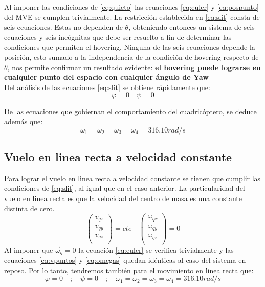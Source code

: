 \documentclass[main]{subfiles}
\begin{document}
Al imponer las condiciones de \ref{eq:quieto} las ecuaciones \ref{eq:euler} y \ref{eq:pospunto} del MVE se cumplen trivialmente. La restricci\'on establecida en \ref{eq:slit} consta de seis ecuaciones. Estas no dependen de $\theta$, obteniendo entonces un sistema de seis ecuaciones y seis inc\'ognitas que debe ser resuelto a fin de determinar las condiciones que permiten el hovering. Ninguna de las seis ecuaciones depende la posici\'on, esto sumado a la independencia de la condici\'on de hovering respecto de $\theta$, nos permite confirmar un resultado evidente: \textbf{el hovering puede lograrse en cualquier punto del espacio con cualquier \'angulo de Yaw}\\

Del an\'alisis de las ecuaciones \ref{eq:slit} se obtiene r\'apidamente que:
\begin{equation}
\varphi=0 \quad \psi=0
\end{equation}

De las ecuaciones que gobiernan el comportamiento del cuadric\'optero, se deduce adem\'as que:
\begin{equation}
\omega_1=\omega_2=\omega_3=\omega_4=316.10 rad/s
\end{equation}

\subsection{Vuelo en linea recta a velocidad constante}

Para lograr el vuelo en linea recta a velocidad constante se tienen que cumplir las condiciones de \ref{eq:slit}, al igual que en el caso anterior. La particularidad del vuelo en linea recta es que la velocidad del centro de masa es una constante distinta de cero. 
\begin{equation}
\label{eq:recta}
\left(\begin{array}{c}
v_{qx}\\
v_{qy}\\
v_{qz}\\
\end{array}\right)=cte \quad
\left(\begin{array}{c}
\omega_{qx}\\
\omega_{qy}\\
\omega_{qz}\\
\end{array}\right)=0
\end{equation}
Al imponer que $\vec{\omega}_q=0$ la ecuaci\'on \ref{eq:euler} se verifica trivialmente y las ecuaciones \ref{eq:vpuntos} y \ref{eq:omegas} quedan id\'enticas al caso del sistema en reposo. Por lo tanto, tendremos tambi\'en para el movimiento en linea recta que:
\begin{equation}
\varphi=0 \quad ; \quad \psi=0 \quad ; \quad \omega_1=\omega_2=\omega_3=\omega_4 = 316.10 rad/s
\end{equation}
\end{document}
